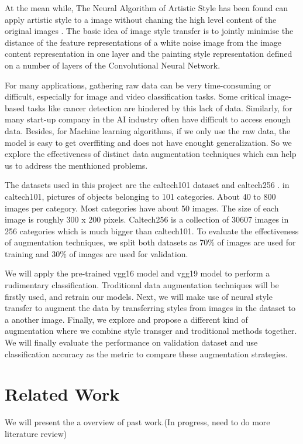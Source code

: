 \documentclass[a4paper,11pt]{article}
\begin{document}
At the mean while, The Neural Algorithm of Artistic Style has been found can apply artistic style to a image without chaning the high level content of the original images \cite{gatys2016image}. The basic idea of image style transfer is to jointly minimise the distance of the feature representations of a white noise image from the image content representation in one layer and the painting style representation defined on a number of layers of the Convolutional Neural Network.

 For many applications, gathering raw data can be very time-consuming or difficult, especially for image and video classification tasks. Some critical image-based tasks like cancer detection \cite{kyprianidis2013state} are hindered by this lack of data. Similarly, for many start-up company in the AI industry often have difficult to access enough data. Besides, for Machine learning algorithms, if we only use the raw data, the model is easy to get overffiting and does not have enought generalization. So we explore the effectiveness of distinct data augmentation techniques which can help us to address the menthioned problems.

The datasets used in this project are the caltech101 dataset\cite{fei2006one} and caltech256 \cite{griffin2007caltech}. in caltech101, pictures of objects belonging to 101 categories. About 40 to 800 images per category. Most categories have about 50 images. The size of each image is roughly 300 x 200 pixels. Caltech256 is a collection of 30607 images in 256 categories which is much bigger than caltech101. To evaluate the effectiveness of augmentation techniques, we split both datasets as 70\% of images are used for training and 30\% of images are used for validation.

We will apply the pre-trained vgg16 model and vgg19 model to perform a rudimentary classification. Troditional data augmentation techniques will be firstly used, and retrain our models. Next, we will make use of neural style transfer to augment the data by transferring styles from images in the dataset to a another image. Finally, we explore and propose a different kind of augmentation where we combine style transger and troditional methods together. We will finally evaluate the performance on validation dataset and use classification accuracy as the metric to compare these augmentation strategies.

\section{Related Work}
We will present the a overview of past work.(In progress, need to do more literature review)
\end{document}
